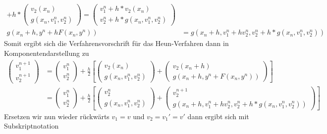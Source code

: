 \begin{exercisePage}
\begin{equation*}
\begin{aligned}
		+ h *
		\begin{pmatrix} v_2(x_n) \\ g(x_n, v_1^n, v_2^n) \end{pmatrix} 
		= 
		\begin{pmatrix} v_1^n + h * v_2(x_n) \\ v_2^n + h * g(x_n, v_1^n, v_2^n) \end{pmatrix} 
		\\
		g(x_n + h, y^n + h F(x_n, y^n)) 
		&= g(x_n + h , v_1^n + h v_2^n , v_2^n + h * g(x_n, v_1^n, v_2^n))
		\end{aligned}
	\end{equation*}
	Somit ergibt sich die Verfahrensvorschrift für das Heun-Verfahren dann in Komponentendarstellung zu
	\begin{equation*}
		\begin{aligned}
		\begin{pmatrix} v_1^{n+1} \\ v_2^{n+1} \end{pmatrix}
		&=
		\begin{pmatrix} v_1^n \\ v_2^n \end{pmatrix}
		+ \frac{h}{2}
		\left[ \begin{pmatrix} v_2(x_n) \\ g(x_n, v_1^n, v_2^n) \end{pmatrix}
		+ \begin{pmatrix} v_2(x_n + h) \\ g(x_n + h, y^n + F(x_n,y^n)) \end{pmatrix} \right] \\
		&= \begin{pmatrix} v_1^n \\ v_2^n \end{pmatrix}
		+ \frac{h}{2}
		\left[ \begin{pmatrix} v_2^n \\ g(x_n, v_1^n, v_2^n) \end{pmatrix}
		+ \begin{pmatrix} v_2^{n+1} \\ g(x_n + h , v_1^n + h v_2^n , v_2^n + h * g(x_n, v_1^n, v_2^n)) \end{pmatrix} \right]
		\end{aligned}
	\end{equation*}
	Ersetzen wir nun wieder rückwärts $v_1 = v$ und $v_2=v_1'=v'$ dann ergibt sich mit Subskriptnotation
	\begin{equation*}
		\begin{aligned}

\end{aligned}
\end{equation*}
\end{exercisePage}
